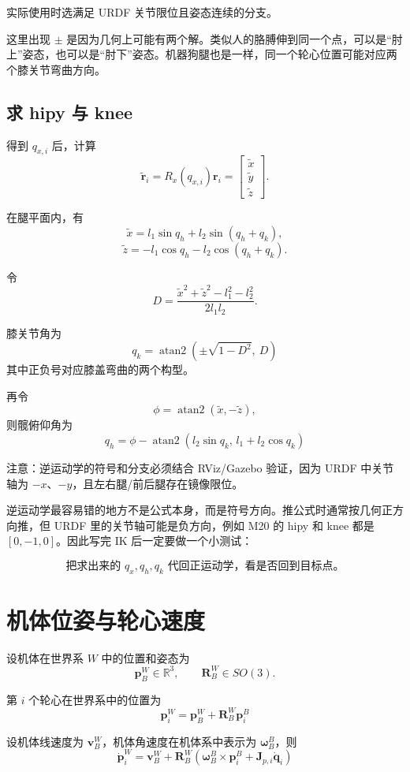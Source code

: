 \documentclass[UTF8,11pt,a4paper]{ctexart}
\newcommand{\R}{\mathbb{R}}
\newcommand{\bs}[1]{\bm{#1}}
\newcommand{\rx}{R_x}
\begin{document}
实际使用时选满足 URDF 关节限位且姿态连续的分支。

这里出现 \(\pm\) 是因为几何上可能有两个解。类似人的胳膊伸到同一个点，可以是“肘上”姿态，也可以是“肘下”姿态。机器狗腿也是一样，同一个轮心位置可能对应两个膝关节弯曲方向。

\subsection{求 hipy 与 knee}

得到 \(q_{x,i}\) 后，计算
\[
\tilde{\bs r}_i
=
\rx(q_{x,i})\bs r_i
=
\begin{bmatrix}
\tilde x\\ \tilde y\\ \tilde z
\end{bmatrix}.
\]

在腿平面内，有
\[
\tilde x =
l_1\sin q_h+l_2\sin(q_h+q_k),
\]
\[
\tilde z =
-l_1\cos q_h-l_2\cos(q_h+q_k).
\]

令
\[
D =
\frac{\tilde x^2+\tilde z^2-l_1^2-l_2^2}{2l_1l_2}.
\]

膝关节角为
\[
\boxed{
q_k =
\operatorname{atan2}
\left(
\pm\sqrt{1-D^2},\ D
\right)
}
\]
其中正负号对应膝盖弯曲的两个构型。

再令
\[
\phi=\operatorname{atan2}(\tilde x,-\tilde z),
\]
则髋俯仰角为
\[
\boxed{
q_h =
\phi
-
\operatorname{atan2}
\left(
l_2\sin q_k,\,
l_1+l_2\cos q_k
\right)
}
\]

注意：逆运动学的符号和分支必须结合 RViz/Gazebo 验证，因为 URDF 中关节轴为 \(-x\)、\(-y\)，且左右腿/前后腿存在镜像限位。

逆运动学最容易错的地方不是公式本身，而是符号方向。推公式时通常按几何正方向推，但 URDF 里的关节轴可能是负方向，例如 M20 的 hipy 和 knee 都是 \([0,-1,0]\)。因此写完 IK 后一定要做一个小测试：

\[
\text{把求出来的 } q_x,q_h,q_k \text{ 代回正运动学，看是否回到目标点。}
\]

\section{机体位姿与轮心速度}

设机体在世界系 \(W\) 中的位置和姿态为
\[
\bs p_B^W\in\R^3,\qquad \bs R_B^W\in SO(3).
\]

第 \(i\) 个轮心在世界系中的位置为
\[
\boxed{
\bs p_i^W
=
\bs p_B^W
+\bs R_B^W\bs p_i^B
}
\]

设机体线速度为 \(\bs v_B^W\)，机体角速度在机体系中表示为 \(\bs \omega_B^B\)，则
\[
\boxed{
\dot{\bs p}_i^W
=
\bs v_B^W
+
\bs R_B^W
\left(
\bs \omega_B^B\times \bs p_i^B
+\bs J_{p,i}\dot{\bs q}_i
\right)
}
\]
\end{document}
